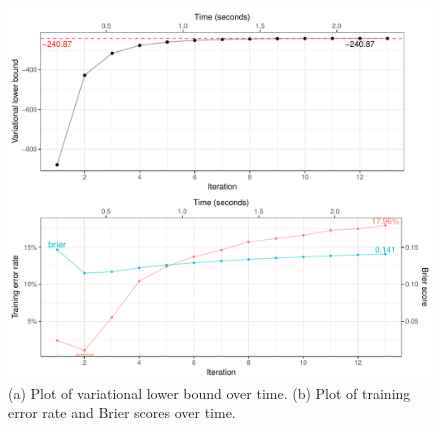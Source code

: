 \documentclass[a4paper,showframe,11pt]{report}\usepackage[]{graphicx}\usepackage[]{color}
\newenvironment{knitrout}{}{} %
\begin{document}
\begin{knitrout}
\color{fgcolor}\begin{figure}

{\centering \includegraphics[width=\linewidth]{figure/cardiac_mod_full_plot-1} 

}

\caption[(a) Plot of variational lower bound over time]{(a) Plot of variational lower bound over time. (b) Plot of training error rate and Brier scores over time.}\label{fig:cardiac.mod.full.plot}
\end{figure}


\end{knitrout}
\end{document}
